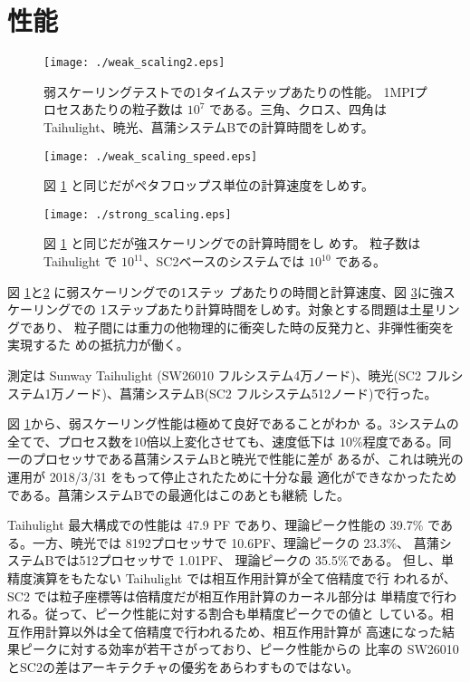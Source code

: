 \documentclass[a4j]{jarticle}
\begin{document}
\section{性能}

\begin{figure}
  \texttt{[image: ./weak\_scaling2.eps]}
  \caption{弱スケーリングテストでの1タイムステップあたりの性能。
    1MPIプロセスあたりの粒子数は $10^7$ である。三角、クロス、四角は
    Taihulight、暁光、菖蒲システムBでの計算時間をしめす。
  }
  \label{fig:weak}
\end{figure}

\begin{figure}
  \centering
  \texttt{[image: ./weak\_scaling\_speed.eps]}
  \caption{図 \ref{fig:weak} と同じだがペタフロップス単位の計算速度をしめす。}
  \label{fig:weakpf}
\end{figure}

\begin{figure}
  \centering
  \texttt{[image: ./strong\_scaling.eps]}
  \caption{図 \ref{fig:weak} と同じだが強スケーリングでの計算時間をし
    めす。
    粒子数は Taihulight で $10^{11}$、SC2ベースのシステムでは $10^{10}$ である。}
  \label{fig:strong}
\end{figure}

図 \ref{fig:weak}と\ref{fig:weakpf} に弱スケーリングでの1ステッ
プあたりの時間と計算速度、図 \ref{fig:strong}に強スケーリングでの
1ステップあたり計算時間をしめす。対象とする問題は土星リングであり、
粒子間には重力の他物理的に衝突した時の反発力と、非弾性衝突を実現するた
めの抵抗力が働く。

測定は Sunway Taihulight (SW26010 フルシステム4万ノード)、暁光(SC2 フルシステム1万ノード)、菖蒲システムB(SC2 フルシステム512ノード)で行った。

図 \ref{fig:weak}から、弱スケーリング性能は極めて良好であることがわか
る。3システムの全てで、プロセス数を10倍以上変化させても、速度低下は
10\%程度である。同一のプロセッサである菖蒲システムBと暁光で性能に差が
あるが、これは暁光の運用が 2018/3/31 をもって停止されたために十分な最
適化ができなかったためである。菖蒲システムBでの最適化はこのあとも継続
した。

Taihulight 最大構成での性能は 47.9 PF であり、理論ピーク性能の 39.7\%
である。一方、暁光では 8192プロセッサで 10.6PF、理論ピークの 23.3\%、
菖蒲システムBでは512プロセッサで 1.01PF、 理論ピークの 35.5\%である。
但し、単精度演算をもたない Taihulight では相互作用計算が全て倍精度で行
われるが、SC2 では粒子座標等は倍精度だが相互作用計算のカーネル部分は
単精度で行われる。従って、ピーク性能に対する割合も単精度ピークでの値と
している。相互作用計算以外は全て倍精度で行われるため、相互作用計算が
高速になった結果ピークに対する効率が若干さがっており、ピーク性能からの
比率の SW26010とSC2の差はアーキテクチャの優劣をあらわすものではない。
\end{document}
